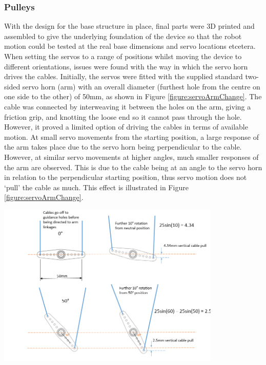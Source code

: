 \documentclass[11pt]{article}
\begin{document}
\subsubsection{Pulleys}
With the design for the base structure in place, final parts were 3D printed and assembled to give the underlying foundation of the device so that the robot motion could be tested at the real base dimensions and servo locations etcetera. When setting the servos to a range of positions whilst moving the device to different orientations, issues were found with the way in which the servo horn drives the cables. Initially, the servos were fitted with the supplied standard two-sided servo horn (arm) with an overall diameter (furthest hole from the centre on one side to the other) of 50mm, as shown in Figure \ref{figure:servoArmChange}. The cable was connected by interweaving it between the holes on the arm, giving a friction grip, and knotting the loose end so it cannot pass through the hole. However, it proved a limited option of driving the cables in terms of available motion. At small servo movements from the starting position, a large response of the arm takes place due to the servo horn being perpendicular to the cable. However, at similar servo movements at higher angles, much smaller responses of the arm are observed. This is due to the cable being at an angle to the servo horn in relation to the perpendicular starting position, thus servo motion does not `pull' the cable as much. This effect is illustrated in Figure \ref{figure:servoArmChange}.


\begin{center}
\includegraphics[width=0.8\textwidth]{images/servoArmChange.png}
\label{figure:servoArmChange}
\end{center}
\end{document}
